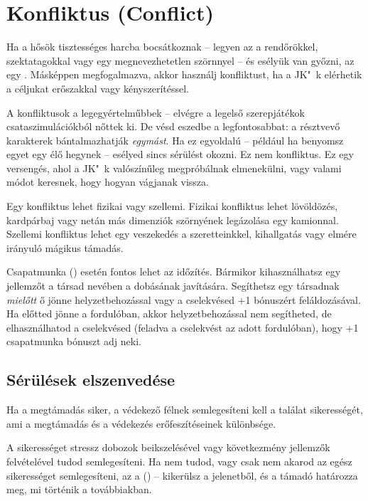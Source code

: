 \section[Konfliktus]{Konfliktus (Conflict)}

Ha a hősök tisztességes harcba bocsátkoznak -- legyen az a rendőrökkel, szektatagokkal vagy egy megnevezhetetlen szörnnyel -- és esélyük van győzni, az egy . Másképpen megfogalmazva, akkor használj konfliktust, ha a JK"~k elérhetik a céljukat erőszakkal vagy kényszerítéssel.

A konfliktusok a legegyértelműbbek -- elvégre a legelső szerepjátékok csataszimulációkból nőttek ki. De vésd eszedbe a legfontosabbat: a résztvevő karakterek bántalmazhatják \emph{egymást}. Ha ez egyoldalú -- például ha benyomsz egyet egy élő hegynek -- esélyed sincs sérülést okozni. Ez nem konfliktus. Ez egy versengés, ahol a JK"~k valószínűleg megpróbálnak elmenekülni, vagy valami módot keresnek, hogy hogyan vágjanak vissza.

Egy konfliktus lehet fizikai vagy szellemi. Fizikai konfliktus lehet lövöldözés, kardpárbaj vagy netán más dimenziók szörnyének legázolása egy kamionnal. Szellemi konfliktus lehet egy veszekedés a szeretteinkkel, kihallgatás vagy elmére irányuló mágikus támadás.

Csapatmunka () esetén fontos lehet az időzítés. Bármikor kihasználhatsz egy jellemzőt a társad nevében a dobásának javítására. Segíthetsz egy társadnak \emph{mielőtt} ő jönne helyzetbehozással vagy a cselekvésed +1 bónuszért feláldozásával. Ha előtted jönne a fordulóban, akkor helyzetbehozással nem segítheted, de elhasználhatod a cselekvésed (feladva a cselekvést az adott fordulóban), hogy +1 csapatmunka bónuszt adj neki.

\subsection{Sérülések elszenvedése}

Ha a megtámadás siker, a védekező félnek semlegesíteni kell a találat sikerességét, ami a megtámadás és a védekezés erőfeszítéseinek különbsége.

A sikerességet stressz dobozok beikszelésével vagy következmény jellemzők felvételével tudod semlegesíteni. Ha nem tudod, vagy csak nem akarod az egész sikerességet semlegesíteni, az a  () -- kikerülsz a jelenetből, és a támadó határozza meg, mi történik a továbbiakban.

